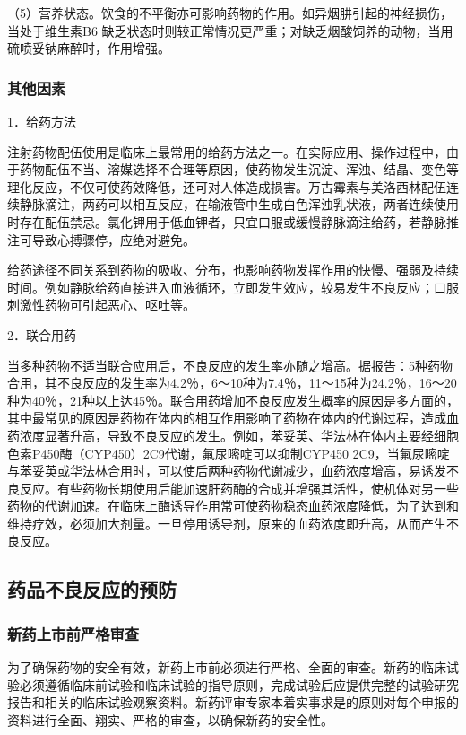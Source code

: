 （5）营养状态。饮食的不平衡亦可影响药物的作用。如异烟肼引起的神经损伤，当处于维生素B{6}
缺乏状态时则较正常情况更严重；对缺乏烟酸饲养的动物，当用硫喷妥钠麻醉时，作用增强。

\subsubsection{其他因素}

1．给药方法

注射药物配伍使用是临床上最常用的给药方法之一。在实际应用、操作过程中，由于药物配伍不当、溶媒选择不合理等原因，使药物发生沉淀、浑浊、结晶、变色等理化反应，不仅可使药效降低，还可对人体造成损害。万古霉素与美洛西林配伍连续静脉滴注，两药可以相互反应，在输液管中生成白色浑浊乳状液，两者连续使用时存在配伍禁忌。氯化钾用于低血钾者，只宜口服或缓慢静脉滴注给药，若静脉推注可导致心搏骤停，应绝对避免。

给药途径不同关系到药物的吸收、分布，也影响药物发挥作用的快慢、强弱及持续时间。例如静脉给药直接进入血液循环，立即发生效应，较易发生不良反应；口服刺激性药物可引起恶心、呕吐等。

2．联合用药

当多种药物不适当联合应用后，不良反应的发生率亦随之增高。据报告：5种药物合用，其不良反应的发生率为4.2％，6～10种为7.4％，11～15种为24.2％，16～20种为40％，21种以上达45％。联合用药增加不良反应发生概率的原因是多方面的，其中最常见的原因是药物在体内的相互作用影响了药物在体内的代谢过程，造成血药浓度显著升高，导致不良反应的发生。例如，苯妥英、华法林在体内主要经细胞色素P450酶（CYP450）2C9代谢，氟尿嘧啶可以抑制CYP450
2C9，当氟尿嘧啶与苯妥英或华法林合用时，可以使后两种药物代谢减少，血药浓度增高，易诱发不良反应。有些药物长期使用后能加速肝药酶的合成并增强其活性，使机体对另一些药物的代谢加速。在临床上酶诱导作用常可使药物稳态血药浓度降低，为了达到和维持疗效，必须加大剂量。一旦停用诱导剂，原来的血药浓度即升高，从而产生不良反应。

\subsection{药品不良反应的预防}

\subsubsection{新药上市前严格审查}

为了确保药物的安全有效，新药上市前必须进行严格、全面的审查。新药的临床试验必须遵循临床前试验和临床试验的指导原则，完成试验后应提供完整的试验研究报告和相关的临床试验观察资料。新药评审专家本着实事求是的原则对每个申报的资料进行全面、翔实、严格的审查，以确保新药的安全性。

